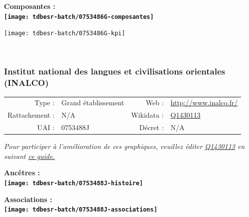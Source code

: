 \documentclass[12pt,french,]{article}
\begin{document}
\hrulefill

\begin{center} \bf Composantes : \\  
\texttt{[image: tdbesr-batch/0753486G-composantes]} \end{center}

\begin{center}\texttt{[image: tdbesr-batch/0753486G-kpi]} \end{center}\checkoddpage

\ifoddpage ~\newpage \fi   

\hypertarget{institut-national-des-langues-et-civilisations-orientales-inalco}{%
\subsubsection{Institut national des langues et civilisations orientales
(INALCO)}\label{institut-national-des-langues-et-civilisations-orientales-inalco}}

\begin{tabular*}{\textwidth}{rp{5cm}rl}  
\hline  
Type : & Grand établissement & Web : &\href{http://www.inalco.fr/}{http://www.inalco.fr/} \\  
Rattachement : & N/A & Wikidata : & \href{https://www.wikidata.org/entity/Q1430113}{Q1430113} \\  
UAI : & 0753488J & Décret : & N/A \\  
\hline  
\end{tabular*}

\textit{\scriptsize Pour participer à l'amélioration de ces graphiques, veuillez éditer  \href{https://www.wikidata.org/entity/Q1430113}{Q1430113}  en suivant \href{https://github.com/cpesr/wikidataESR/blob/master/Rmd/wikidataESR.md}{ce guide.}}

\vspace{1cm}  
\begin{minipage}[b]{0.50\textwidth}\begin{center} \bf Ancêtres : \\  
\texttt{[image: tdbesr-batch/0753488J-histoire]} \end{center}\end{minipage}\begin{minipage}[b]{0.50\textwidth}\begin{center} \bf Associations : \\  
\texttt{[image: tdbesr-batch/0753488J-associations]} \end{center}\end{minipage}
\end{document}
